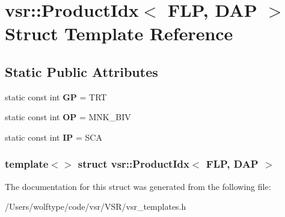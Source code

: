 \hypertarget{structvsr_1_1_product_idx_3_01_f_l_p_00_01_d_a_p_01_4}{\section{vsr\-:\-:Product\-Idx$<$ F\-L\-P, D\-A\-P $>$ Struct Template Reference}
\label{structvsr_1_1_product_idx_3_01_f_l_p_00_01_d_a_p_01_4}
}
\subsection*{Static Public Attributes}
\begin{DoxyCompactItemize}
\item 
\hypertarget{structvsr_1_1_product_idx_3_01_f_l_p_00_01_d_a_p_01_4_a4ea8f4aea33c76788ab2f8f87bf5154a}{static const int {\bfseries G\-P} = T\-R\-T}\label{structvsr_1_1_product_idx_3_01_f_l_p_00_01_d_a_p_01_4_a4ea8f4aea33c76788ab2f8f87bf5154a}

\item 
\hypertarget{structvsr_1_1_product_idx_3_01_f_l_p_00_01_d_a_p_01_4_acb4f6cafc4e2d3b484be1b61bc25ddfc}{static const int {\bfseries O\-P} = M\-N\-K\-\_\-\-B\-I\-V}\label{structvsr_1_1_product_idx_3_01_f_l_p_00_01_d_a_p_01_4_acb4f6cafc4e2d3b484be1b61bc25ddfc}

\item 
\hypertarget{structvsr_1_1_product_idx_3_01_f_l_p_00_01_d_a_p_01_4_ab8860b0a0f680c5e09365f47c831106c}{static const int {\bfseries I\-P} = S\-C\-A}\label{structvsr_1_1_product_idx_3_01_f_l_p_00_01_d_a_p_01_4_ab8860b0a0f680c5e09365f47c831106c}

\end{DoxyCompactItemize}
\subsubsection*{template$<$$>$ struct vsr\-::\-Product\-Idx$<$ F\-L\-P, D\-A\-P $>$}



The documentation for this struct was generated from the following file\-:\begin{DoxyCompactItemize}
\item 
/\-Users/wolftype/code/vsr/\-V\-S\-R/vsr\-\_\-templates.\-h\end{DoxyCompactItemize}
